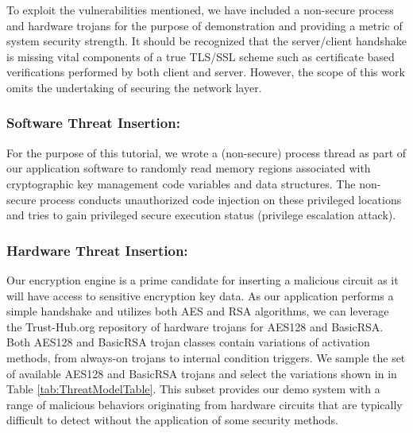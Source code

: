 \documentclass[sigconf]{acmart}
\theoremstyle{plain}
\theoremstyle{remark}
\begin{document}
To exploit the vulnerabilities mentioned, we have included a non-secure process and hardware trojans for the purpose of demonstration and providing a metric of system security strength. It should be recognized that the server/client handshake is missing vital components of a true TLS/SSL scheme such as certificate based verifications performed by both client and server. However, the scope of this work omits the undertaking of securing the network layer.

\subsubsection{Software Threat Insertion:}
For the purpose of this tutorial, we wrote a (non-secure) process thread as part of our application software to randomly read memory regions associated with cryptographic key management code variables and data structures. The non-secure process conducts unauthorized code injection on these privileged locations and tries to gain privileged secure execution status (privilege escalation attack).


\subsubsection{Hardware Threat Insertion:}

Our encryption engine is a prime candidate for inserting a malicious circuit as it will have access to sensitive encryption key data. As our application performs a simple handshake and utilizes both AES and RSA algorithms, we can leverage the Trust-Hub.org repository of hardware trojans for AES128 and BasicRSA. Both AES128 and BasicRSA trojan classes contain variations of activation methods, from always-on trojans to internal condition triggers. We sample the set of available AES128 and BasicRSA trojans and select the variations shown in in Table \ref{tab:ThreatModelTable}. This subset provides our demo system with a range of malicious behaviors originating from hardware circuits that are typically difficult to detect without the application of some security methods.
\end{document}
